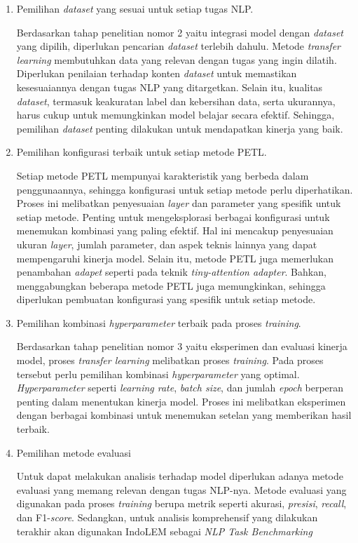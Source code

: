 \begin{enumerate}
    \item Pemilihan \textit{dataset} yang sesuai untuk setiap tugas NLP.
    
    Berdasarkan tahap penelitian nomor 2 yaitu integrasi model dengan \textit{dataset} yang dipilih, diperlukan pencarian \textit{dataset} terlebih dahulu. Metode \textit{transfer learning} membutuhkan data yang relevan dengan tugas yang ingin dilatih. Diperlukan penilaian terhadap konten \textit{dataset} untuk memastikan kesesuaiannya dengan tugas NLP yang ditargetkan. Selain itu, kualitas \textit{dataset}, termasuk keakuratan label dan kebersihan data, serta ukurannya, harus cukup untuk memungkinkan model belajar secara efektif. Sehingga, pemilihan \textit{dataset} penting dilakukan untuk mendapatkan kinerja yang baik.

    \item Pemilihan konfigurasi terbaik untuk setiap metode PETL.
    
    Setiap metode PETL mempunyai karakteristik yang berbeda dalam penggunaannya, sehingga konfigurasi untuk setiap metode perlu diperhatikan. Proses ini melibatkan penyesuaian \textit{layer} dan parameter yang spesifik untuk setiap metode. Penting untuk mengeksplorasi berbagai konfigurasi untuk menemukan kombinasi yang paling efektif. Hal ini mencakup penyesuaian ukuran \textit{layer}, jumlah parameter, dan aspek teknis lainnya yang dapat mempengaruhi kinerja model. Selain itu, metode PETL juga memerlukan penambahan \textit{adapet} seperti pada teknik \textit{tiny-attention adapter}. Bahkan, menggabungkan beberapa metode PETL juga memungkinkan, sehingga diperlukan pembuatan konfigurasi yang spesifik untuk setiap metode.


    \item Pemilihan kombinasi \textit{hyperparameter} terbaik pada proses \textit{training}.
    
    Berdasarkan tahap penelitian nomor 3 yaitu eksperimen dan evaluasi kinerja model, proses \textit{transfer learning} melibatkan proses \textit{training}. Pada proses tersebut perlu pemilihan kombinasi \textit{hyperparameter} yang optimal. \textit{Hyperparameter} seperti \textit{learning rate}, \textit{batch size}, dan jumlah \textit{epoch} berperan penting dalam menentukan kinerja model. Proses ini melibatkan eksperimen dengan berbagai kombinasi untuk menemukan setelan yang memberikan hasil terbaik. 
    
    \item Pemilihan metode evaluasi
    
    Untuk dapat melakukan analisis terhadap model diperlukan adanya metode evaluasi yang memang relevan dengan tugas NLP-nya. Metode evaluasi yang digunakan pada proses \textit{training} berupa metrik seperti akurasi, \textit{presisi}, \textit{recall}, dan F1-\textit{score}. Sedangkan, untuk analisis komprehensif yang dilakukan terakhir akan digunakan IndoLEM sebagai \textit{NLP Task Benchmarking}

\end{enumerate}